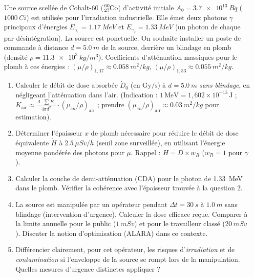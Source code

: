 \documentclass[11pt]{article}
\begin{document}
\begin{exercice}
Une source scellée de Cobalt-60 ($\ce{^{60}_{27}Co}$) d'activité initiale $A_0 = \SI{3,7e13}{Bq}$ ($\SI{1000}{Ci}$) est utilisée pour l'irradiation industrielle. Elle émet deux photons $\gamma$ principaux d'énergies $E_{\gamma_1} = \SI{1,17}{MeV}$ et $E_{\gamma_2} = \SI{1,33}{MeV}$ (un photon de chaque par désintégration). La source est ponctuelle. On souhaite installer un poste de commande à distance $d = \SI{5,0}{m}$ de la source, derrière un blindage en plomb (densité $\rho = \SI{11,3e3}{kg/m^3}$). Coefficients d'atténuation massiques pour le plomb à ces énergies : $(\mu/\rho)_{1,17} \approx \SI{0,058}{m^2/kg}$, $(\mu/\rho)_{1,33} \approx \SI{0,055}{m^2/kg}$.
\begin{enumerate}
    \item Calculer le débit de dose absorbée $\dot{D}_0$ (en $\text{Gy/s}$) à $d = \SI{5,0}{m}$ \textit{sans blindage}, en négligeant l'atténuation dans l'air. (Indication : $1\,\text{MeV} = 1,602 \times 10^{-13}\,\text{J}$ ; $K_{\text{air}} \approx \frac{A \cdot \sum E_\gamma}{4\pi d^2} \cdot (\mu_{en}/\rho)_{\text{air}}$ ; prendre $(\mu_{en}/\rho)_{\text{air}} \approx \SI{0,03}{m^2/kg}$ pour estimation).
    \item Déterminer l'épaisseur $x$ de plomb nécessaire pour réduire le débit de dose équivalente $\dot{H}$ à $\SI{2,5}{\mu Sv/h}$ (seuil zone surveillée), en utilisant l'énergie moyenne pondérée des photons pour $\mu$. Rappel : $H = D \times w_R$ ($w_R=1$ pour $\gamma$).
    \item Calculer la couche de demi-atténuation (CDA) pour le photon de \SI{1,33}{MeV} dans le plomb. Vérifier la cohérence avec l'épaisseur trouvée à la question 2.
    \item La source est manipulée par un opérateur pendant $\Delta t = \SI{30}{s}$ à $\SI{1,0}{m}$ sans blindage (intervention d'urgence). Calculer la dose efficace reçue. Comparer à la limite annuelle pour le public ($\SI{1}{mSv}$) et pour le travailleur classé ($\SI{20}{mSv}$). Discuter la notion d'optimisation (ALARA) dans ce contexte.
    \item Différencier clairement, pour cet opérateur, les risques d'\textit{irradiation} et de \textit{contamination} si l'enveloppe de la source se rompt lors de la manipulation. Quelles mesures d'urgence distinctes appliquer ?
\end{enumerate}
\end{exercice}
\end{document}
